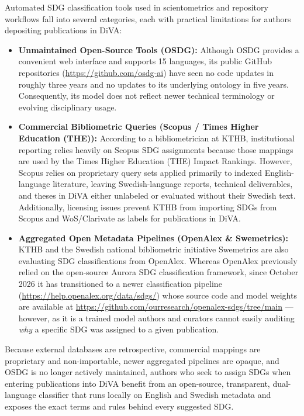 Automated \gls{SDG} classification tools used in scientometrics and repository workflows fall into several categories, each with practical limitations for authors depositing publications in \gls{DiVA}:
\begin{itemize}
    \item \textbf{Unmaintained Open-Source Tools (OSDG):} Although OSDG provides a convenient web interface and supports 15 languages, its public GitHub repositories (\url{https://github.com/osdg-ai}) have seen no code updates in roughly three years and no updates to its underlying ontology in five years. Consequently, its model does not reflect newer technical terminology or evolving disciplinary usage.

    \item \textbf{Commercial Bibliometric Queries (Scopus / Times Higher Education (THE)):} According to a bibliometrician at \gls{KTHB}, institutional reporting relies heavily on Scopus \gls{SDG} assignments because those mappings are used by the Times Higher Education (THE) Impact Rankings. However, Scopus relies on proprietary query sets applied primarily to indexed English-language literature, leaving Swedish-language reports, technical deliverables, and theses in \gls{DiVA} either unlabeled or evaluated without their Swedish text. Additionally, licensing issues prevent \gls{KTHB} from importing \glspl{SDG} from Scopus and WoS/Clarivate as labels for publications in \gls{DiVA}.

    \item \textbf{Aggregated Open Metadata Pipelines (OpenAlex \& Swemetrics):} \gls{KTHB} and the Swedish national bibliometric initiative Swemetrics are also evaluating \gls{SDG} classifications from OpenAlex. Whereas OpenAlex previously relied on the open-source Aurora \gls{SDG} classification framework, since October 2026 it has transitioned to a newer classification pipeline (\href{https://help.openalex.org/data/sdgs/}{https://help.openalex.org/data/sdgs/}) whose source code and model weights are available at \url{https://github.com/ourresearch/openalex-sdgs/tree/main} --- however, as it is a trained model authors and curators cannot easily auditing \emph{why} a specific \gls{SDG} was assigned to a given publication.
\end{itemize}

Because external databases are retrospective, commercial mappings are proprietary and non-importable, newer aggregated pipelines are opaque, and OSDG is no longer actively maintained, authors who seek to assign \glspl{SDG} when entering publications into \gls{DiVA} benefit from an open-source, transparent, dual-language classifier that runs locally on English and Swedish metadata and exposes the exact terms and rules behind every suggested \gls{SDG}.

